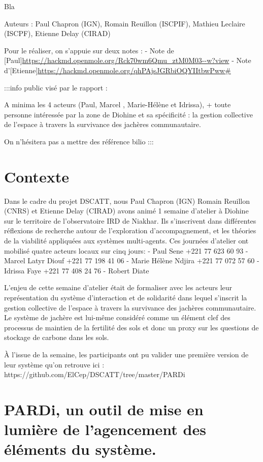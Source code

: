 Bla

\newpage



Auteurs : Paul Chapron (IGN), Romain Reuillon (ISCPIF), Mathieu Leclaire (ISCPF), Etienne Delay (CIRAD)

Pour le réaliser, on s'appuie sur deux notes : 
- Note de [Paul]\url{https://hackmd.openmole.org/Rck70wm6Qmu_ztM0M03--w?view}
- Note d'[Etienne]\url{https://hackmd.openmole.org/qhPAjsJGRbiOQYIItbwPww#}


:::info
public visé par le rapport : 

A minima les 4 acteurs (Paul, Marcel ,  Marie-Hélène et Idrissa), + toute personne intéressée par la zone de Diohine et sa spécificité : la gestion collective de l’espace à travers la survivance des jachères communautaire.

On n'hésitera pas a mettre des référence bilio
:::


\section{Contexte}

Dans le cadre du projet DSCATT, nous Paul Chapron (IGN) Romain Reuillon (CNRS) et Etienne Delay (CIRAD) avons animé 1 semaine d'atelier à Diohine sur le territoire de l'observatoire IRD de Niakhar. Ils s'inscrivent dans différentes réflexions de recherche autour de l'exploration d'accompagnement, et les théories de la viabilité appliquées aux systèmes multi-agents.
Ces journées d'atelier ont mobilisé quatre acteurs locaux sur cinq jours: 
- Paul Sene +221 77 623 60 93
- Marcel Latyr Diouf +221 77 198 41 06
- Marie Hélène Ndjira +221 77 072 57 60
- Idrissa Faye +221 77 408 24 76
- Robert Diate 

L'enjeu de cette semaine d'atelier était de formaliser avec les acteurs leur représentation du système d'interaction et de solidarité dans lequel s'inscrit la gestion collective de l'espace à travers la survivance des jachères communautaire. Le système de jachère est lui-même considéré comme un élément clef des processus de maintien de la fertilité des sols et donc un proxy sur les questions de stockage de carbone dans les sols. 

À l'issue de la semaine, les participants ont pu valider une première version de leur système qu'on retrouve ici : https://github.com/ElCep/DSCATT/tree/master/PARDi

\section{PARDi, un outil de mise en lumière de l'agencement des éléments du système.}

